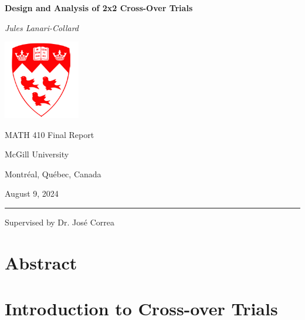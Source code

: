 \documentclass[12pt, TexShade, letterpaper]{report}
\begin{document}
\begin{titlepage}
		\begin{center}
			\vspace*{0.5cm}

			\LARGE
			\textbf{Design and Analysis of 2x2 Cross-Over Trials}
			
			\vspace{1cm}
			
			\textit{Jules Lanari-Collard}
			
			\vspace{1.2cm}
			
			\includegraphics[width=0.25\textwidth]{mcglogo.png}
			
			\Large
			MATH 410 Final Report
			
			\vspace{-5mm}
			McGill University
			
			\vspace{-5mm}
			Montr\'eal, Qu\'ebec, Canada
			
			\vspace{5mm}
			August 9, 2024
			\small
			\vspace{0.5cm}
			{\color{red} \hrule height 0.75mm}
			
			\vspace{0.2cm}
			
			Supervised by Dr. José Correa
		\end{center}
\end{titlepage}

\setlength{\voffset}{2cm}
\renewcommand{\chaptermark}[1]{%
	\markboth{\thechapter.\ #1}{}}
\chapter*{Abstract}
	\label{chap:engAbstract}

	\tableofcontents\thispagestyle{plain}

 	\clearpage

\chapter{Introduction to Cross-over Trials}
\end{document}
